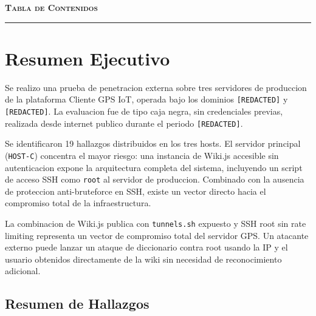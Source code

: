 \documentclass[11pt,a4paper]{article}
\begin{document}
\nopagecolor
{}
\setcounter{page}{1}

\thispagestyle{empty}
\begin{center}
{\large\bfseries\scshape\color{accentbluedark} Tabla de Contenidos}\\[0.3cm]
{\color{accentblue}\rule{4cm}{0.5pt}}
\end{center}
\vspace{0.3cm}
\tableofcontents
\newpage

\section{Resumen Ejecutivo}

Se realizo una prueba de penetracion externa sobre tres servidores de produccion
de la plataforma Cliente GPS IoT, operada bajo los dominios \texttt{[REDACTED]}
y \texttt{[REDACTED]}. La evaluacion fue de tipo caja negra, sin credenciales
previas, realizada desde internet publico durante el periodo \texttt{[REDACTED]}.

Se identificaron 19 hallazgos distribuidos en los tres hosts. El servidor
principal (\texttt{HOST-C}) concentra el mayor riesgo: una instancia
de Wiki.js accesible sin autenticacion expone la arquitectura completa del
sistema, incluyendo un script de acceso SSH como \texttt{root} al servidor
de produccion. Combinado con la ausencia de proteccion anti-bruteforce en SSH,
existe un vector directo hacia el compromiso total de la infraestructura.

\vspace{0.4cm}

\begin{tcolorbox}[colback=critical!8, colframe=critical, boxrule=1pt, arc=3pt,
  title={\textbf{Riesgo Critico Confirmado}},
  fonttitle=\bfseries\color{white}, coltitle=white, colbacktitle=critical]
La combinacion de Wiki.js publica con \texttt{tunnels.sh} expuesto y SSH root
sin rate limiting representa un vector de compromiso total del servidor GPS.
Un atacante externo puede lanzar un ataque de diccionario contra root usando
la IP y el usuario obtenidos directamente de la wiki sin necesidad de
reconocimiento adicional.
\end{tcolorbox}

\vspace{0.4cm}

\subsection*{Resumen de Hallazgos}
\end{document}
